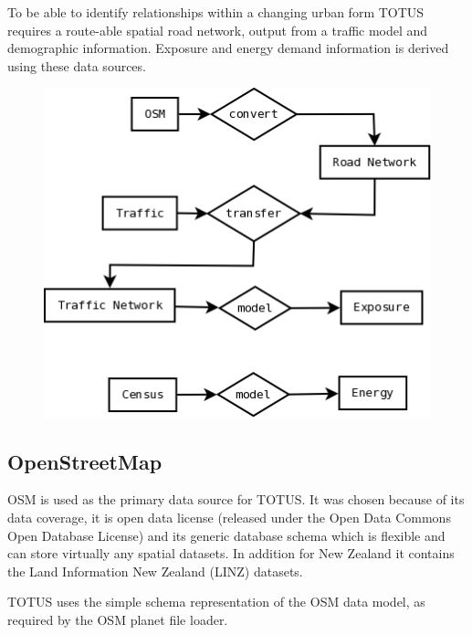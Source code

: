 To be able to identify relationships within a changing urban form TOTUS
requires a route-able spatial road network, output from a traffic model
and demographic information. Exposure and energy demand information is
derived using these data sources.

\begin{figure}[h]
 \centering
 \includegraphics[scale=0.4,keepaspectratio=true]{./system_data.png}
\end{figure}


\subsection{OpenStreetMap}
OSM is used as the primary data source for TOTUS. It was chosen because
of its data coverage, it is open data license (released under the Open
Data Commons Open Database License) and its generic database schema
which is flexible and can store virtually any spatial datasets. In
addition for New Zealand it contains the Land Information New Zealand
(LINZ) datasets.

TOTUS uses the simple schema representation of the OSM data model, as
required by the OSM planet file loader.

